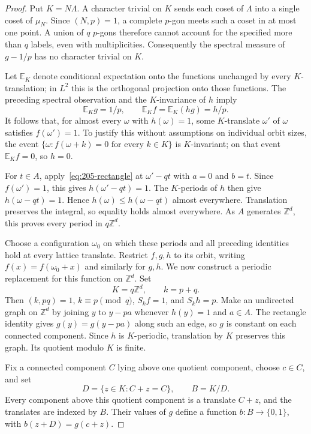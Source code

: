 \documentclass[11pt,reqno]{amsart}
\newcommand{\Z}{\mathbb Z}
\newcommand{\E}{\mathbb E}
\theoremstyle{definition}
\theoremstyle{remark}
\numberwithin{equation}{section}
\begin{document}
\begin{proof}
Put $K=N\Lambda$. A character trivial on $K$ sends each coset of
$\Lambda$ into a single coset of $\mu_N$. Since $(N,p)=1$, a complete
$p$-gon meets such a coset in at most one point. A union of $q$
$p$-gons therefore cannot account for the specified more than $q$
labels, even with multiplicities. Consequently the spectral measure
of $g-1/p$ has no character trivial on $K$.

Let $\E_K$ denote conditional expectation onto the functions unchanged
by every $K$-translation; in $L^2$ this is the orthogonal projection
onto those functions. The preceding spectral observation and the
$K$-invariance of $h$ imply
\[
 \E_Kg=1/p,\qquad \E_Kf=\E_K(hg)=h/p.
\]
It follows that, for almost every $\omega$ with $h(\omega)=1$, some $K$-translate
$\omega'$ of $\omega$ satisfies $f(\omega')=1$. To justify this without assumptions on
individual orbit sizes, the event
$\{\omega:f(\omega+k)=0\text{ for every }k\in K\}$ is $K$-invariant;
on that event $\E_Kf=0$, so $h=0$.

For $t\in A$, apply~\eqref{eq:205-rectangle} at $\omega'-qt$ with
$a=0$ and $b=t$. Since $f(\omega')=1$, this gives $h(\omega'-qt)=1$.
The $K$-periods of $h$ then give $h(\omega-qt)=1$. Hence
$h(\omega)\le h(\omega-qt)$ almost everywhere. Translation preserves the
integral, so equality holds almost everywhere. As $A$ generates
$\Z^d$, this proves every period in $q\Z^d$.

Choose a configuration $\omega_0$ on which these periods and all
preceding identities hold at every lattice translate. Restrict $f,g,h$
to its orbit, writing $f(x)=f(\omega_0+x)$ and similarly for $g,h$.
We now construct a periodic replacement for this function on $\Z^d$.
Set
\[
 K=q\Z^d,\qquad k=p+q.
\]
Then $(k,pq)=1$, $k\equiv p\pmod q$, $S_kf=1$, and $S_kh=p$.
Make an undirected graph on $\Z^d$ by joining $y$ to $y-pa$ whenever
$h(y)=1$ and $a\in A$. The rectangle identity gives
$g(y)=g(y-pa)$ along such an edge, so $g$ is constant on each
connected component. Since $h$ is $K$-periodic, translation by $K$
preserves this graph. Its quotient modulo $K$ is finite.

Fix a connected component $C$ lying above one quotient component,
choose $c\in C$, and set
\[
 D=\{z\in K:C+z=C\},\qquad B=K/D.
\]
Every component above this quotient component is a translate $C+z$,
and the translates are indexed by $B$. Their values of $g$ define
a function $b:B\to\{0,1\}$, with
$b(z+D)=g(c+z)$.


\end{proof}
\end{document}

